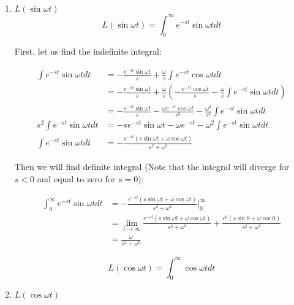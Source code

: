 \begin{enumerate}
    \item $L(\sin{\omega t})$
        \[L(\sin{\omega t}) = \int_0^{\infty} e^{-st} \sin{\omega t} dt\]

        First, let us find the indefinite integral:
        
        \begin{displaymath}
            \begin{aligned}
                \int e^{-st} \sin{\omega t} dt & = -\frac{e^{-st} \sin{\omega t}}{s} + \frac{\omega}{s} \int e^{-st} \cos{\omega t} dt \\
                & = -\frac{e^{-st} \sin{\omega t}}{s} + \frac{\omega}{s} (-\frac{e^{-st} \cos{\omega t}}{s} - \frac{\omega}{s} \int e^{-st} \sin{\omega t} dt) \\
                & = -\frac{e^{-st} \sin{\omega t}}{s} - \frac{\omega e^{-st} \cos{\omega t}}{s^2} - \frac{\omega^2}{s^2} \int e^{-st} \sin{\omega t} dt \\
                s^2 \int e^{-st} \sin{\omega t} dt & = -s e^{-st} \sin{\omega t} - \omega e^{-st} - \omega^2 \int e^{-st} \sin{\omega t} dt \\
                \int e^{-st} \sin{\omega t} dt & = -\frac{e^{-st} (s \sin{\omega t} + \omega \cos{\omega t})}{s^2 + \omega^2}
            \end{aligned}
        \end{displaymath}
        
        Then we will find definite integral (Note that the integral will diverge for $s < 0$ and equal to zero for $s = 0$):
        
        \begin{displaymath}
            \begin{aligned}
                \int_0^{\infty} e^{-st} \sin{\omega t} dt & = -\frac{e^{-st} (s \sin{\omega t} + \omega \cos{\omega t})}{s^2 + \omega^2}\Bigr|_0^{\infty} \\ 
                & = \lim_{l \to \infty} \frac{e^{-sl} (s \sin{\omega l} + \omega \cos{\omega l})}{s^2 + \omega^2} + \frac{e^0 (s \sin{0} + \omega \cos{0})}{s^2 + \omega^2} \\
                & = \frac{\omega}{s^2 + \omega^2}
            \end{aligned}
        \end{displaymath}
        
        \[L(\cos{\omega t}) = \int_0^{\infty} \cos{\omega t} dt\]
    \item $L(\cos{\omega t})$
    

\end{enumerate}
